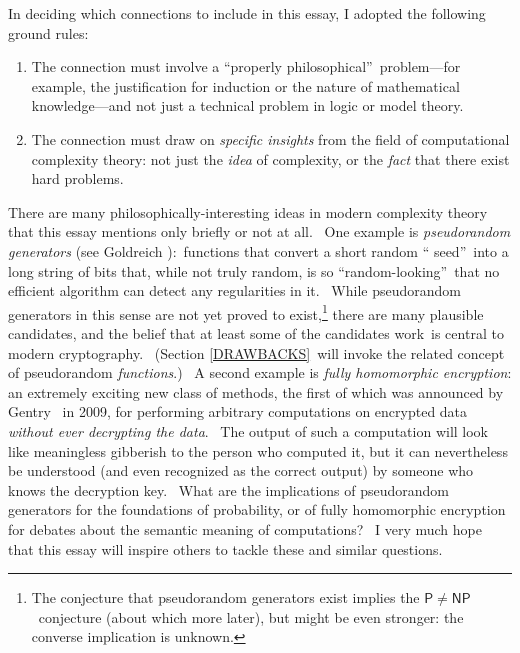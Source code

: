 \documentclass[11pt,onecolumn]{article}%
\begin{document}
In deciding which connections to include in this essay, I adopted the
following ground rules:

\begin{enumerate}
\item[(1)] The connection must involve a \textquotedblleft properly
philosophical\textquotedblright\ problem---for example, the justification for
induction or the nature of mathematical knowledge---and not just a technical
problem in logic or model theory.

\item[(2)] The connection must draw on \textit{specific insights} from the
field of computational complexity theory: not just the \textit{idea} of
complexity, or the \textit{fact} that there exist hard problems.
\end{enumerate}

There are many philosophically-interesting ideas in modern complexity theory
that this essay mentions only briefly or not at all. \ One example is
\textit{pseudorandom generators} (see Goldreich \cite{goldreich:prg}%
):\ functions that convert a short random \textquotedblleft
seed\textquotedblright\ into a long string of bits that, while not truly
random, is so \textquotedblleft random-looking\textquotedblright\ that no
efficient algorithm can detect any regularities in it. \ While pseudorandom
generators in this sense are not yet proved to exist,\footnote{The conjecture
that pseudorandom generators exist implies the $\mathsf{P}\neq\mathsf{NP}%
$\ conjecture (about which more later), but might be even stronger: the
converse implication is unknown.} there are many plausible candidates, and the
belief that at least some of the candidates work\ is central to modern
cryptography. \ (Section \ref{DRAWBACKS}\ will invoke the related concept of
pseudorandom \textit{functions}.) \ A second example is \textit{fully
homomorphic encryption}: an extremely exciting new class of methods, the first
of which was announced by Gentry \cite{gentry}\ in 2009, for performing
arbitrary computations on encrypted data \textit{without ever decrypting the
data}. \ The output of such a computation will look like meaningless gibberish
to the person who computed it, but it can nevertheless be understood (and even
recognized as the correct output) by someone who knows the decryption key.
\ What are the implications of pseudorandom generators for the foundations of
probability, or of fully homomorphic encryption for debates about the semantic
meaning of computations? \ I very much hope that this essay will inspire
others to tackle these and similar questions.
\end{document}
